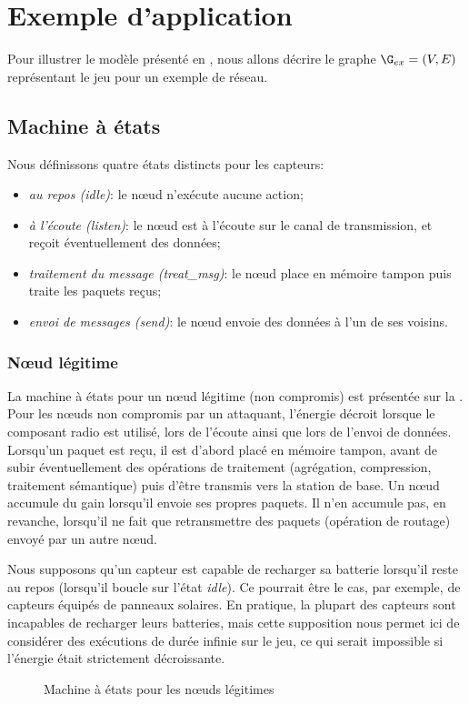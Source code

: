 \section{Exemple d'application}
\label{tj:sec:example}
Pour illustrer le modèle présenté en , nous allons décrire le graphe $\G_{ex} = (V,E)$ représentant le jeu pour un exemple de réseau.

    \subsection{Machine à états}

Nous définissons quatre états distincts pour les capteurs:
\begin{itemize}
    \item \emph{au repos (idle)}: le nœud n'exécute aucune action;
    \item \emph{à l'écoute (listen)}: le nœud est à l'écoute sur le canal de transmission, et reçoit éventuellement des données;
    \item \emph{traitement du message (treat\_msg)}: le nœud place en mémoire tampon puis traite les paquets reçus;
    \item \emph{envoi de messages (send)}: le nœud envoie des données à l'un de ses voisins.
\end{itemize}

        \subsubsection{Nœud légitime}
La machine à états pour un nœud légitime (non compromis) est présentée sur la .
Pour les nœuds non compromis par un attaquant, l'énergie décroit lorsque le composant radio est utilisé, \cad lors de l'écoute ainsi que lors de l'envoi de données.
Lorsqu'un paquet est reçu, il est d'abord placé en mémoire tampon, avant de subir éventuellement des opérations de traitement (agrégation, compression, traitement sémantique) puis d'être transmis vers la station de base.
Un nœud accumule du gain lorsqu'il envoie ses propres paquets.
Il n'en accumule pas, en revanche, lorsqu'il ne fait que retransmettre des paquets (opération de routage) envoyé par un autre nœud.

Nous supposons qu'un capteur est capable de recharger sa batterie lorsqu'il reste au repos (\cad lorsqu'il boucle sur l'état \emph{idle}).
Ce pourrait être le cas, par exemple, de capteurs équipés de panneaux solaires.
En pratique, la plupart des capteurs sont incapables de recharger leurs batteries, mais cette supposition nous permet ici de considérer des exécutions de durée infinie sur le jeu, ce qui serait impossible si l'énergie était strictement décroissante.
\begin{figure}[H]
    \centering
    
    \caption{Machine à états pour les nœuds légitimes}\label{tj:fig:autGoodNode}
\end{figure}

